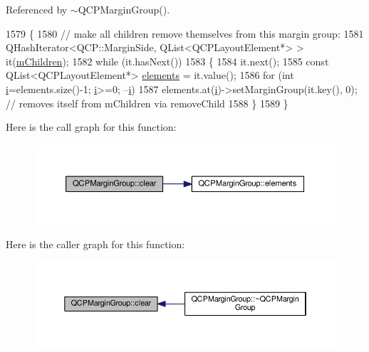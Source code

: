 Referenced by $\sim$\+Q\+C\+P\+Margin\+Group().


\begin{DoxyCode}
1579 \{
1580   \textcolor{comment}{// make all children remove themselves from this margin group:}
1581   QHashIterator<QCP::MarginSide, QList<QCPLayoutElement*> > it(\hyperlink{class_q_c_p_margin_group_a954bc89ff8958b9bb6a4a0d08ed5fc0f}{mChildren});
1582   \textcolor{keywordflow}{while} (it.hasNext())
1583   \{
1584     it.next();
1585     \textcolor{keyword}{const} QList<QCPLayoutElement*> \hyperlink{class_q_c_p_margin_group_a2f39e319c9ece34e0392c2ca350f1069}{elements} = it.value();
1586     \textcolor{keywordflow}{for} (\textcolor{keywordtype}{int} \hyperlink{_comparision_pictures_2_createtest_image_8m_a6f6ccfcf58b31cb6412107d9d5281426}{i}=elements.size()-1; \hyperlink{_comparision_pictures_2_createtest_image_8m_a6f6ccfcf58b31cb6412107d9d5281426}{i}>=0; --\hyperlink{_comparision_pictures_2_createtest_image_8m_a6f6ccfcf58b31cb6412107d9d5281426}{i})
1587       elements.at(\hyperlink{_comparision_pictures_2_createtest_image_8m_a6f6ccfcf58b31cb6412107d9d5281426}{i})->setMarginGroup(it.key(), 0); \textcolor{comment}{// removes itself from mChildren via removeChild}
1588   \}
1589 \}
\end{DoxyCode}


Here is the call graph for this function\+:\nopagebreak
\begin{figure}[H]
\begin{center}
\leavevmode
\includegraphics[width=350pt]{class_q_c_p_margin_group_a144b67f216e4e86c3a3a309e850285fe_cgraph}
\end{center}
\end{figure}




Here is the caller graph for this function\+:\nopagebreak
\begin{figure}[H]
\begin{center}
\leavevmode
\includegraphics[width=350pt]{class_q_c_p_margin_group_a144b67f216e4e86c3a3a309e850285fe_icgraph}
\end{center}
\end{figure}


